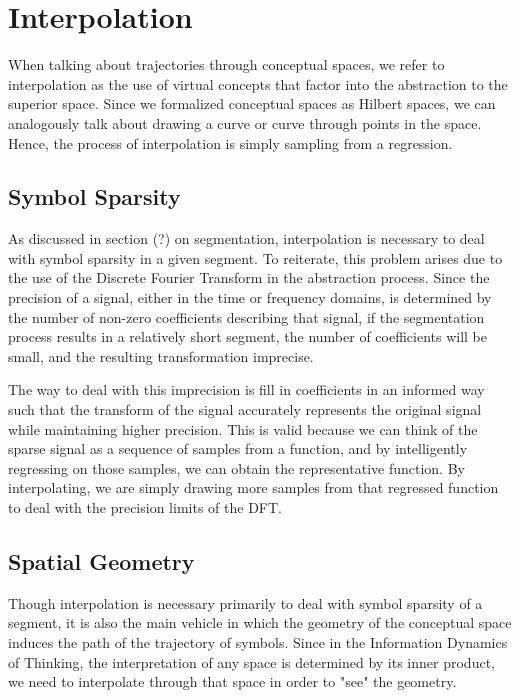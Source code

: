 \chapter{Interpolation}
When talking about trajectories through conceptual spaces, we refer to interpolation as the use of virtual concepts that factor into the abstraction to the superior space.  Since we formalized conceptual spaces as Hilbert spaces, we can analogously talk about drawing a curve or curve through points in the space.  Hence, the process of interpolation is simply sampling from a regression.

\section{Symbol Sparsity}
As discussed in section (?) on segmentation, interpolation is necessary to deal with symbol sparsity in a given segment.  To reiterate, this problem arises due to the use of the Discrete Fourier Transform in the abstraction process.  Since the precision of a signal, either in the time or frequency domains, is determined by the number of non-zero coefficients describing that signal, if the segmentation process results in a relatively short segment, the number of coefficients will be small, and the resulting transformation imprecise.

The way to deal with this imprecision is fill in coefficients in an informed way such that the transform of the signal accurately represents the original signal while maintaining higher precision.  This is valid because we can think of the sparse signal as a sequence of samples from a function, and by intelligently regressing on those samples, we can obtain the representative function.  By interpolating, we are simply drawing more samples from that regressed function to deal with the precision limits of the DFT.

\section{Spatial Geometry}
Though interpolation is necessary primarily to deal with symbol sparsity of a segment, it is also the main vehicle in which the geometry of the conceptual space induces the path of the trajectory of symbols.  Since in the Information Dynamics of Thinking, the interpretation of any space is determined by its inner product, we need to interpolate through that space in order to "see" the geometry.

